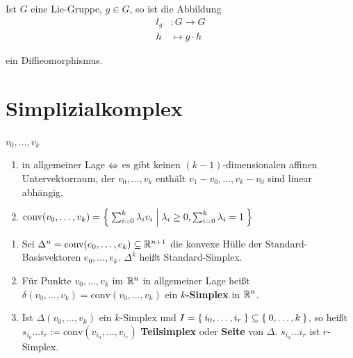\begin{bemerkung}
    Ist $G$ eine Lie-Gruppe, $g \in G$, so ist die Abbildung
    \begin{align*}
        l_g &: G \rightarrow G\\
        h  &\mapsto g \cdot h
    \end{align*}

    ein Diffieomorphismus.
\end{bemerkung}

\section{Simplizialkomplex}
\begin{definition}
    $v_0, \dots, v_k$
    \begin{enumerate}[label=\alph*),ref=\theplaindefinition.\alph*]
        \item in allgemeiner Lage $\Leftrightarrow$ es gibt keinen $(k-1)$-dimensionalen
              affinen Untervektorraum, der $v_0, \dots, v_k$ enthält
              \gdw $v_1 - v_0, \dots, v_k - v_0$ sind linear abhängig.
        \item $\text{conv}(v_0, \dots, v_k) = \Set{\sum_{i=0}^k \lambda_i v_i | \lambda_i \geq 0, \sum_{i=0}^k \lambda_i = 1} $
    \end{enumerate}
\end{definition}

\begin{definition}
    \begin{enumerate}[label=\alph*),ref=\theplaindefinition.\alph*]
        \item Sei $\Delta^n = \text{conv}(e_0, \dots, e_k) \subseteq \mathbb{R}^{n+1}$ 
              die konvexe Hülle der Standard-Basisvektoren $e_0, \dots, e_k$.
              $\Delta^k$ heißt Standard-Simplex.
        \item Für Punkte $v_0, \dots, v_k$ im $\mathbb{R}^n$ in allgemeiner
              Lage heißt $\delta (v_0, \dots, v_k) = \text{conv}(v_0, \dots, v_k)$
              ein \textbf{$k$-Simplex} in $\mathbb{R}^n$.
        \item Ist $\Delta (v_0, \dots, v_k)$ ein $k$-Simplex und
              $I = \Set{i_0, \dots, i_r} \subseteq \Set{0, \dots, k}$,
              so heißt $s_{i_0} \dots i_r := \text{conv}(v_{i_0}, \dots, v_{i_r})$
              \textbf{Teilsimplex} oder \textbf{Seite}
              von $\Delta$. $s_{i_0} \dots i_r$ ist $r$-Simplex.
    \end{enumerate}
\end{definition}

